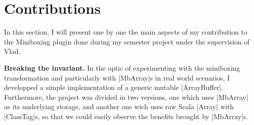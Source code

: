 \section{Contributions}
\label{sec:contrib}

In this section, I will present one by one the main aspects of my contribution to the Miniboxing plugin done during my semester project under the supervision of Vlad.

\textbf{Breaking the invariant.} In the optic of experimenting with the miniboxing transformation and particularly with |MbArray|s in real world scenarios, I developped a simple implementation of a generic mutable |ArrayBuffer|. Furthermore, the project was divided in two versions, one which uses |MbArray| as its underlying storage, and another one wich uses raw Scala |Array| with |ClassTag|s, so that we could easily observe the benefits brought by |MbArray|s. 


